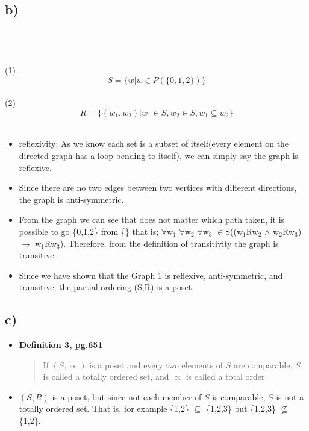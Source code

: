 \documentclass[11pt]{article}
\begin{document}
\subsection*{b)}
\\
\\
\\
(1)\[S = \{w|w\in P(\{0,1,2\})\}\]\\
(2)\[R = \{(w_{1},w_{2})|w_{1}\in S,w_{2}\in S,w_{1} \subseteq w_{2}\}\]\\
\begin{itemize}
    \item reflexivity: As we know each set is a subset of itself(every element on the directed graph has a loop bending to itself), we can simply say the graph is reflexive.
    \item Since there are no two edges between two vertices with different directions, the graph is anti-symmetric.
    \item From the graph we can see that does not matter which path taken, it is possible to go \{0,1,2\} from \{\} that is; $\forall$w$_{1}$ $\forall$w$_{2}$ $\forall$w$_{3}$ $\in$S((w$_{1}$Rw$_{2}$ $\wedge$ w$_{2}$Rw$_{3}$) $\rightarrow$ w$_{1}$Rw$_{3}$). Therefore, from the definition of transitivity the graph is transitive.
    \item Since we have shown that the Graph 1 is reflexive, anti-symmetric, and transitive, the partial ordering (S,R) is a poset.
\end{itemize}
\subsection*{c)}
\begin{itemize}
    \item  \textbf{Definition 3, pg.651}
    \begin{quote}
        If $(S, \propto) $ is a poset and every two elements of $S$ are comparable, $S$ is called a totally ordered set, and $\propto$ is called a total order.
    \end{quote}
    \item $(S,R)$ is a poset, but since not each member of $S$ is comparable, $S$ is not a totally ordered set. That is, for example \{1,2\} $\subseteq$ \{1,2,3\} but \{1,2,3\} $\not\subseteq$ \{1,2\}.
\end{itemize}
\end{document}
